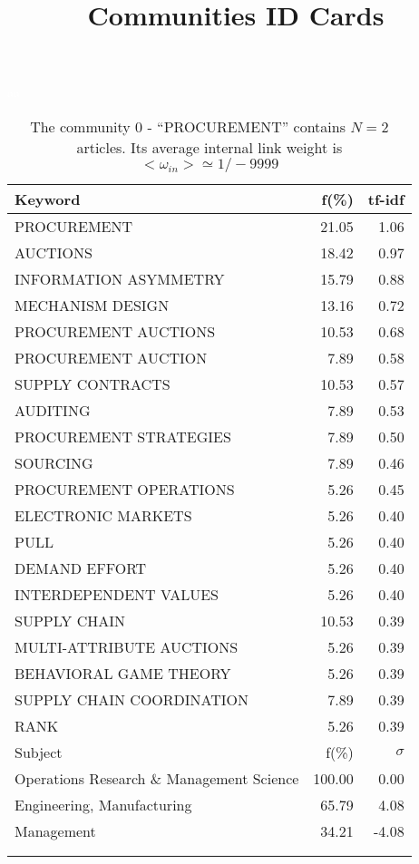 \documentclass[a4paper,11pt]{report}
\title{{\bf Communities ID Cards}}
\date{\begin{flushleft}This document gather the ``ID Cards'' of the CC communities found within your database.\\
 The CC network was built by keeping a link between articles sharing at least 5 references. The communities characterized here correspond to the ones found in the level 0 (in the sense of the Louvain algo) which gathers more than 0 articles.\\
 These ID cards displays the most frequent keywords, subject categories, journals of publication, institution, countries, authors, references and reference journals of the articles of each community. The significance of an item $\sigma = \sqrt{N} (f - p) / \sqrt{p(1-p)}$ [where $N$ is the number of articles within the community and $f$ and $p$ are the proportion of articles respectively within the community and within the database displaying that item ] is also given (for example $\sigma > 5$ is really highly significant). The tf-idf value which can be calculated by $tf-idf = f*log(frac{1}{p})$ is also given.\\
\vspace{1cm}
\copyright Sebastian Grauwin, Liu Weizhi - (2014) \end{flushleft}}
\begin{document}
\begin{landscape}
\maketitle
\clearpage

\begin{table}[!ht]
\caption{The community 0 - ``PROCUREMENT'' contains $N = 2$ articles. Its average internal link weight is $<\omega_{in}> \simeq 1/-9999$ }
\textcolor{white}{aa}\\
{\scriptsize\begin{tabular}{|l r  r|}
\hline
Keyword & f(\%) & tf-idf \\
\hline
PROCUREMENT & 21.05 & 1.06\\
AUCTIONS & 18.42 & 0.97\\
INFORMATION ASYMMETRY & 15.79 & 0.88\\
MECHANISM DESIGN & 13.16 & 0.72\\
PROCUREMENT AUCTIONS & 10.53 & 0.68\\
PROCUREMENT AUCTION & 7.89 & 0.58\\
SUPPLY CONTRACTS & 10.53 & 0.57\\
AUDITING & 7.89 & 0.53\\
PROCUREMENT STRATEGIES & 7.89 & 0.50\\
SOURCING & 7.89 & 0.46\\
PROCUREMENT OPERATIONS & 5.26 & 0.45\\
ELECTRONIC MARKETS & 5.26 & 0.40\\
PULL & 5.26 & 0.40\\
DEMAND EFFORT & 5.26 & 0.40\\
INTERDEPENDENT VALUES & 5.26 & 0.40\\
SUPPLY CHAIN & 10.53 & 0.39\\
MULTI-ATTRIBUTE AUCTIONS & 5.26 & 0.39\\
BEHAVIORAL GAME THEORY & 5.26 & 0.39\\
SUPPLY CHAIN COORDINATION & 7.89 & 0.39\\
RANK & 5.26 & 0.39\\
\hline
\hline
Subject & f(\%) & $\sigma$\\
\hline
Operations Research \& Management Science & 100.00 & 0.00\\
Engineering, Manufacturing & 65.79 & 4.08\\
Management & 34.21 & -4.08\\
 &  & \\
 &  & \\

\end{tabular}}
\end{table}
\end{landscape}
\end{document}
